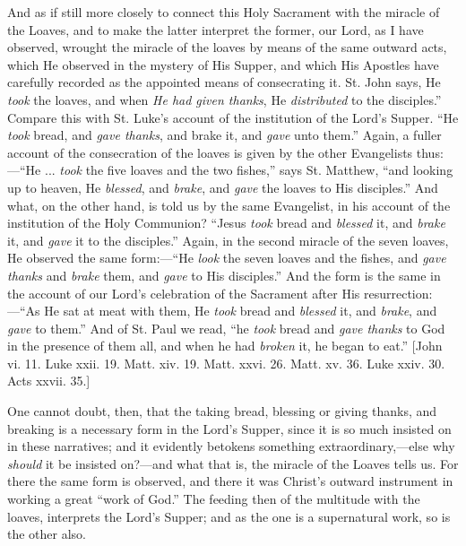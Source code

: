 And as if still more closely to connect this Holy Sacrament with
the miracle of the Loaves, and to make the latter interpret the
former, our Lord, as I have observed, wrought the miracle of the
loaves by means of the same outward acts, which He observed in the
mystery of His Supper, and which His Apostles have carefully recorded
as the appointed means of consecrating it. St. John says, He \emph{took}
the loaves, and when \emph{He had given thanks}, He \emph{distributed}
to the disciples.'' Compare this with St. Luke's account of the
institution of the Lord's Supper. ``He \emph{took} bread, and \emph{gave
thanks}, and brake it, and \emph{gave} unto them.'' Again, a
fuller account of the consecration of the loaves is given by the other
Evangelists thus:—``He ... \emph{took} the five loaves and the
two fishes,'' says St. Matthew, ``and looking up to heaven, He
\emph{blessed}, and \emph{brake}, and \emph{gave} the loaves to His
disciples.'' And what, on the other hand, is told us by the same
Evangelist, in his account of the institution of the Holy Communion?
``Jesus \emph{took} bread and \emph{blessed} it, and \emph{brake}
it, and \emph{gave} it to the disciples.'' Again, in the second
miracle of the seven loaves, He observed the same form:—``He \emph{look}
the seven loaves and the fishes, and \emph{gave thanks} and \emph{brake}
them, and \emph{gave} to His disciples.'' And the form is the same
in the account of our Lord's celebration of the Sacrament after His
resurrection:—``As He sat at meat with them, He \emph{took}
bread and \emph{blessed} it, and \emph{brake}, and \emph{gave} to
them.'' And of St. Paul we read, ``he \emph{took} bread and \emph{gave
thanks} to God in the presence of them all, and when he had \emph{broken}
it, he began to eat.'' [John vi. 11. Luke xxii. 19. Matt. xiv. 19.
Matt. xxvi. 26. Matt. xv. 36. Luke xxiv. 30. Acts xxvii. 35.]

One cannot doubt, then, that the taking bread, blessing or giving
thanks, and breaking is a necessary form in the Lord's Supper, since
it is so much insisted on in these narratives; and it evidently
betokens something extraordinary,—else why \emph{should} it be
insisted on?—and what that is, the miracle of the Loaves tells us.
For there the same form is observed, and there it was Christ's outward
instrument in working a great ``work of God.'' The feeding
then of the multitude with the loaves, interprets the Lord's Supper;
and as the one is a supernatural work, so is the other also.

